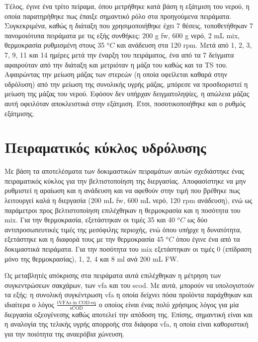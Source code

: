 \documentclass[11pt]{report}
\begin{document}
Τέλος, έγινε ένα τρίτο πείραμα, όπου μετρήθηκε κατά βάση η εξάτμιση του νερού, η οποία παρατηρήθηκε πως έπαιξε σημαντικό ρόλο στα προηγούμενα πειράματα. Συγκεκριμένα, καθώς η διάταξη που χρησιμοποιήθηκε έχει 7 θέσεις, τοποθετήθηκαν 7 πανομοιότυπα πειράματα με τις εξής συνθήκες: 200 g \acrshort{fw}, 600 g νερό, 2 mL \acrshort{mix}, θερμοκρασία ρυθμισμένη στους 35 \(^oC\) και ανάδευση στα 120 rpm. Μετά από 1, 2, 3, 7, 9, 11 και 14 ημέρες μετά την έναρξη του πειράματος, ένα από τα 7 δείγματα αφαιρούταν από την διάταξη και μετριόταν η μάζα του καθώς και τα TS του. Αφαιρώντας την μείωση μάζας των στερεών (η οποία οφείλεται καθαρά στην υδρόλυση) από την μείωση της συνολικής υγρής μάζας, μπόρεσε να προσδιοριστεί η μείωση της μάζας του νερού. Εφόσον δεν υπήρχαν δειγματοληψίες, η απώλεια μάζας αυτή οφειλόταν αποκλειστικά στην εξάτμιση. Έτσι, ποσοτικοποιήθηκε και ο ρυθμός εξάτμισης.

\section{Πειραματικός κύκλος υδρόλυσης}
\label{sec:orgce47dfd}
\label{sec:lab-hydro}
Με βάση τα αποτελέσματα των δοκιμαστικών πειραμάτων αυτών σχεδιάστηκε ένας πειραματικός κύκλος για την βελτιστοποίηση της διεργασίας. Αποφασίστηκε να μην ρυθμιστεί η αραίωση και η ανάδευση και να αφεθούν στην τιμή που βρέθηκε πως λειτουργεί καλά η διεργασία (200 mL \acrshort{fw}, 600 mL νερό, 120 rpm ανάδευση), ενώ ως παράμετροι προς βελτιστοποίηση επιλέχθηκαν η θερμοκρασία και η ποσότητα του \acrshort{mix}. Για την θερμοκρασία, εξετάστηκαν οι τιμές 35 και 40 \(^oC\) ως δύο αντιπροσωπευτικές τιμές της μεσόφιλης περιοχής, ενώ όπου υπήρχε η δυνατότητα, εξετάστηκε και η διαφορά τους με την θερμοκρασία 45 \(^oC\) όπου έγινε ένα από τα δοκιμαστικά πειράματα. Για την ποσότητα του \acrshort{mix} εξετάστηκαν οι τιμές 0 (επίδραση μόνο της θερμοκρασίας), 1, 2, 4 και 8 ml ανά 200 mL FW. 

Ως μεταβλητές απόκρισης στα πειράματα αυτά επιλέχθηκαν η μέτρηση των συγκεντρώσεων σακχάρων, των \acrshort{vfa} και του \acrshort{scod}.  Με αυτά, μπορούν να υπολογιστούν τα εξής: η συνολική συγκέντρωση \acrshort{vfa} η οποία δείχνει πόσα προϊόντα παράχθηκαν και ιδιαίτερα ο λόγος \(\frac{\text{tVFAs in COD-eq}}{\text{sCOD}}\) ο οποίος είναι ένας πολύ χρήσιμος λόγος για μία διεργασία οξεογένεσης καθώς αποτελεί την απόδοση της. Επίσης, σημαντική είναι και η αναλογία της τελικής υγρής απορροής στα διάφορα \acrshort{vfa}, η οποία είναι καθοριστική για την ποιότητα της αναερόβια χώνευση.
\end{document}
